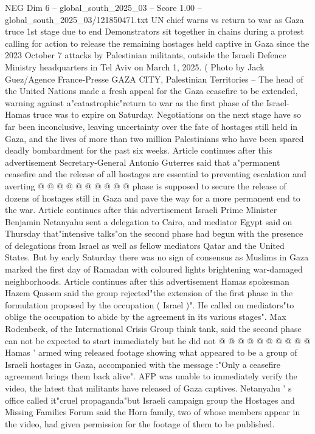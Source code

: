 \begin{textsample}{NEG Dim 6 – global\_south\_2025\_03 – Score 1.00 – global\_south\_2025\_03/121850471.txt}  \label{ex:f6_neg_144}
UN chief warns vs return to war as Gaza truce 1st stage due to end Demonstrators sit together in chains during a protest calling for action to release the remaining hostages held captive in Gaza since the 2023 October 7 attacks by Palestinian militants, outside the Israeli Defence Ministry headquarters in Tel Aviv on March 1, 2025. ( Photo by Jack Guez/Agence France-Presse GAZA CITY, Palestinian Territories -- The head of the United Nations made a fresh appeal for the Gaza ceasefire to be extended, warning against a"catastrophic"return to war as the first phase of the Israel-Hamas truce was to expire on Saturday.
Negotiations on the next stage have so far been inconclusive, leaving uncertainty over the fate of hostages still held in Gaza, and the lives of more than two million Palestinians who have been spared deadly bombardment for the past six weeks.
Article continues after this advertisement Secretary-General Antonio Guterres said that a"permanent ceasefire and the release of all hostages are essential to preventing escalation and averting @ @ @ @ @ @ @ @ @ @ phase is supposed to secure the release of dozens of hostages still in Gaza and pave the way for a more permanent end to the war.
Article continues after this advertisement Israeli Prime Minister Benjamin Netanyahu sent a delegation to Cairo, and mediator Egypt said on Thursday that"intensive talks"on the second phase had begun with the presence of delegations from Israel as well as fellow mediators Qatar and the United States.
But by early Saturday there was no sign of consensus as Muslims in Gaza marked the first day of Ramadan with coloured lights brightening war-damaged neighborhoods.
Article continues after this advertisement Hamas spokesman Hazem Qassem said the group rejected"the extension of the first phase in the formulation proposed by the occupation ( Israel )".
He called on mediators"to oblige the occupation to abide by the agreement in its various stages".
Max Rodenbeck, of the International Crisis Group think tank, said the second phase can not be expected to start immediately but he did not @ @ @ @ @ @ @ @ @ @ Hamas ' armed wing released footage showing what appeared to be a group of Israeli hostages in Gaza, accompanied with the message :"Only a ceasefire agreement brings them back alive".
AFP was unable to immediately verify the video, the latest that militants have released of Gaza captives.
Netanyahu ' s office called it"cruel propaganda"but Israeli campaign group the Hostages and Missing Families Forum said the Horn family, two of whose members appear in the video, had given permission for the footage of them to be published.

\end{textsample}
